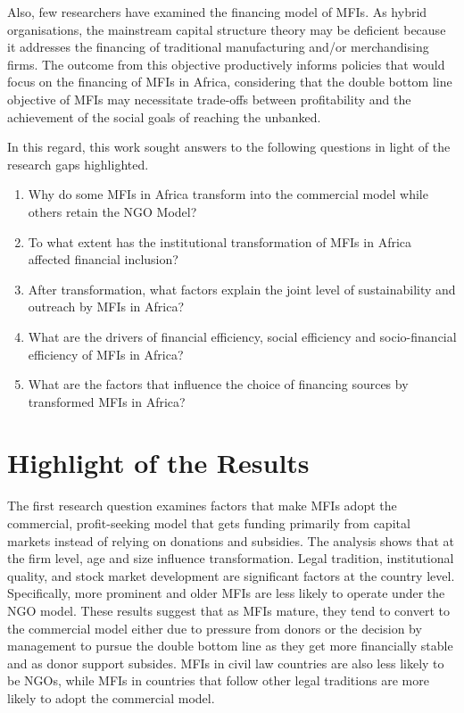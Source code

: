 \documentclass[a4paper, nobind]{templates/ociamthesis}
\begin{document}
Also, few researchers have examined the financing model of MFIs. As hybrid organisations, the mainstream capital structure theory may be deficient because it addresses the financing of traditional manufacturing and/or merchandising firms. The outcome from this objective productively informs policies that would focus on the financing of MFIs in Africa, considering that the double bottom line objective of MFIs may necessitate trade-offs between profitability and the achievement of the social goals of reaching the unbanked.

In this regard, this work sought answers to the following questions in light of the research gaps highlighted.

\begin{enumerate}
\def\labelenumi{\arabic{enumi}.}
\item
  Why do some MFIs in Africa transform into the commercial model while others retain the NGO Model?
\item
  To what extent has the institutional transformation of MFIs in Africa affected financial inclusion?
\item
  After transformation, what factors explain the joint level of sustainability and outreach by MFIs in Africa?
\item
  What are the drivers of financial efficiency, social efficiency and socio-financial efficiency of MFIs in Africa?
\item
  What are the factors that influence the choice of financing sources by transformed MFIs in Africa?
\end{enumerate}

\hypertarget{highlight-of-the-results}{%
\section{Highlight of the Results}\label{highlight-of-the-results}}

The first research question examines factors that make MFIs adopt the commercial, profit-seeking model that gets funding primarily from capital markets instead of relying on donations and subsidies. The analysis shows that at the firm level, age and size influence transformation. Legal tradition, institutional quality, and stock market development are significant factors at the country level. Specifically, more prominent and older MFIs are less likely to operate under the NGO model. These results suggest that as MFIs mature, they tend to convert to the commercial model either due to pressure from donors or the decision by management to pursue the double bottom line as they get more financially stable and as donor support subsides. MFIs in civil law countries are also less likely to be NGOs, while MFIs in countries that follow other legal traditions are more likely to adopt the commercial model.
\end{document}
